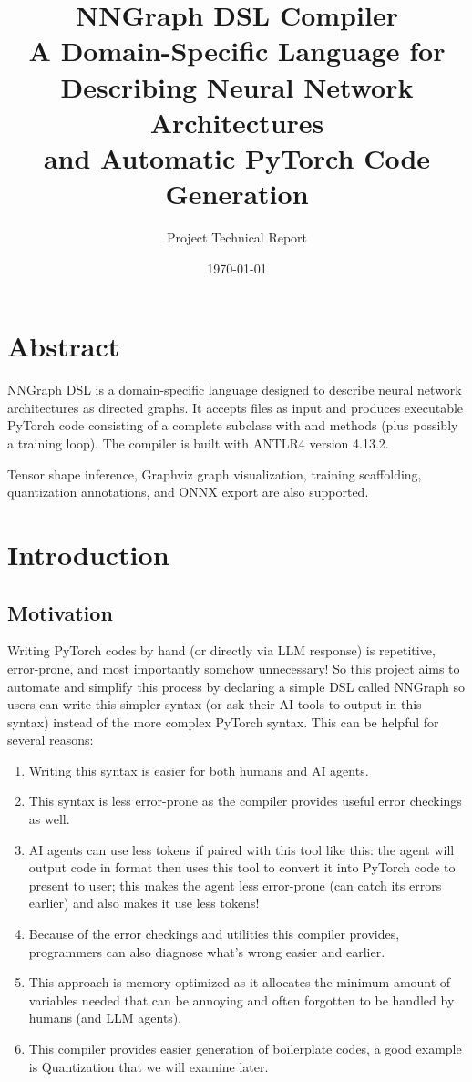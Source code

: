 \documentclass{nngraph-en}
\title{
    \textbf{NNGraph DSL Compiler} \\[0.5em]
    \large A Domain-Specific Language for Describing Neural Network Architectures \\
    and Automatic PyTorch Code Generation
}
\author{\large Project Technical Report}
\date{\today}
\begin{document}
\maketitle
\tableofcontents
\newpage

\chapter*{Abstract}

NNGraph DSL is a domain-specific language designed to describe neural network architectures as directed graphs. It accepts  files as input and produces executable PyTorch code consisting of a complete  subclass with  and  methods (plus possibly a training loop). The compiler is built with ANTLR4 version 4.13.2.

Tensor shape inference, Graphviz graph visualization, training scaffolding, quantization annotations, and ONNX export are also supported.



\chapter{Introduction}
\section{Motivation}

Writing  PyTorch codes by hand (or directly via LLM response) is repetitive, error-prone, and most importantly somehow unnecessary! So this project aims to automate and simplify this process by declaring a simple DSL called NNGraph so users can write this simpler syntax (or ask their AI tools to output in this syntax) instead of the more complex PyTorch syntax. This can be helpful for several reasons:

\begin{enumerate}
    \item Writing this syntax is easier for both humans and AI agents.
    \item This syntax is less error-prone as the compiler provides useful error checkings as well.
    \item AI agents can use less tokens if paired with this tool like this: the agent will output code in  format then uses this tool to convert it into PyTorch code to present to user; this makes the agent less error-prone (can catch its errors earlier) and also makes it use less tokens!
    \item Because of the error checkings and utilities this compiler provides, programmers can also diagnose what's wrong easier and earlier.
    \item This approach is memory optimized as it allocates the minimum amount of variables needed that can be annoying and often forgotten to be handled by humans (and LLM agents).
    \item This compiler provides easier generation of boilerplate codes, a good example is Quantization that we will examine later.
\end{enumerate}
\end{document}
